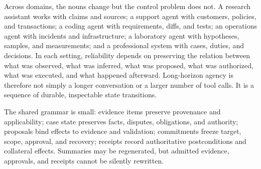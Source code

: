 Across domains, the nouns change but the control problem does not. A research assistant works with claims and sources; a support agent with customers, policies, and transactions; a coding agent with requirements, diffs, and tests; an operations agent with incidents and infrastructure; a laboratory agent with hypotheses, samples, and measurements; and a professional system with cases, duties, and decisions. In each setting, reliability depends on preserving the relation between what was observed, what was inferred, what was proposed, what was authorized, what was executed, and what happened afterward. Long-horizon agency is therefore not simply a longer conversation or a larger number of tool calls. It is a sequence of durable, inspectable state transitions.

The shared grammar is small: evidence items preserve provenance and applicability; case state preserves facts, disputes, obligations, and authority; proposals bind effects to evidence and validation; commitments freeze target, scope, approval, and recovery; receipts record authoritative postconditions and collateral effects. Summaries may be regenerated, but admitted evidence, approvals, and receipts cannot be silently rewritten.

